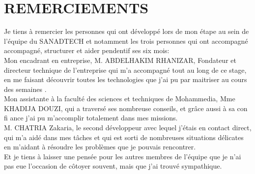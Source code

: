 \documentclass[11pt, oneside]{Thesis} %
\begin{document}
\clearpage %



\clearpage %

\clearpage %
\chapter*{REMERCIEMENTS}


Je tiens à remercier les personnes qui ont développé lors de mon étape au sein de l'équipe du SANADTECH et notamment les trois personnes qui ont accompagné accompagné, structurer et aider pendentif ses six mois:\\[0.5cm]
Mon encadrant en entreprise, M. ABDELHAKIM RHANIZAR, Fondateur et directeur technique de l'entreprise qui m'a accompagné tout au long de ce stage, en me faisant découvrir toutes les technologies que j'ai pu par maitriser au cours des semaines . \\
Mon assistante à la faculté des sciences et techniques de Mohammedia, Mme KHADIJA DOUZI, qui a traversé ses nombreuse conseils, et grâce aussi à sa con fi ance j'ai pu m'accomplir totalement dans mes missions.\\
M. CHATRIA Zakaria, le second développeur avec lequel j'étais en contact direct, qui m'a aidé dans mes tâches et qui est sorti de nombreuses situations délicates en m'aidant à résoudre les problèmes que je pouvais rencontrer.\\[0.2cm]
Et je tiens à laisser une pensée pour les autres membres de l’équipe que je n’ai pas eue l’occasion de côtoyer souvent, mais que j’ai trouvé sympathique.



%

\clearpage %


\clearpage %
\end{document}
